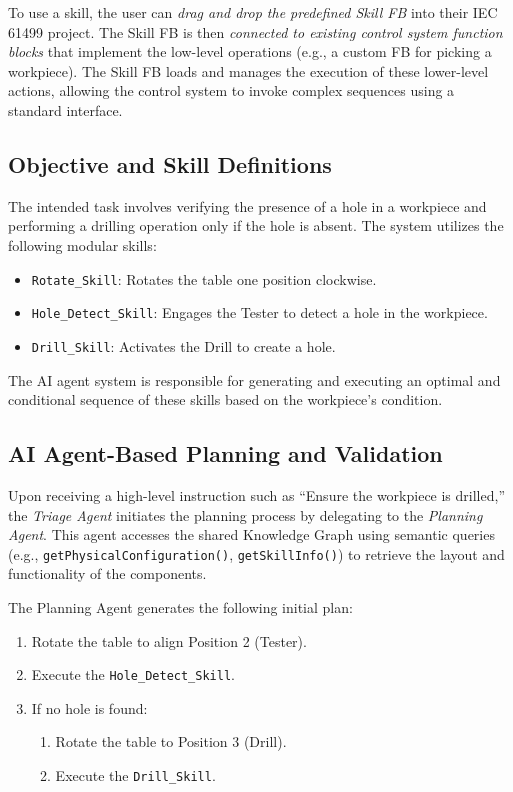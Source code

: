 \documentclass[conference]{IEEEtran}
\begin{document}
To use a skill, the user can \textit{drag and drop the predefined Skill FB} into their IEC 61499 project. The Skill FB is then \textit{connected to existing control system function blocks} that implement the low-level operations (e.g., a custom FB for picking a workpiece). The Skill FB loads and manages the execution of these lower-level actions, allowing the control system to invoke complex sequences using a standard interface.


\subsection{Objective and Skill Definitions}
The intended task involves verifying the presence of a hole in a workpiece and performing a drilling operation only if the hole is absent. The system utilizes the following modular skills:
\begin{itemize}
    \item \texttt{Rotate\_Skill}: Rotates the table one position clockwise.
    \item \texttt{Hole\_Detect\_Skill}: Engages the Tester to detect a hole in the workpiece.
    \item \texttt{Drill\_Skill}: Activates the Drill to create a hole.
\end{itemize}

The AI agent system is responsible for generating and executing an optimal and conditional sequence of these skills based on the workpiece's condition.

\subsection{AI Agent-Based Planning and Validation}
Upon receiving a high-level instruction such as ``Ensure the workpiece is drilled,'' the \textit{Triage Agent} initiates the planning process by delegating to the \textit{Planning Agent}. This agent accesses the shared Knowledge Graph using semantic queries (e.g., \texttt{getPhysicalConfiguration()}, \texttt{getSkillInfo()}) to retrieve the layout and functionality of the components.

The Planning Agent generates the following initial plan:
\begin{enumerate}
    \item Rotate the table to align Position 2 (Tester).
    \item Execute the \texttt{Hole\_Detect\_Skill}.
    \item If no hole is found:
    \begin{enumerate}
        \item Rotate the table to Position 3 (Drill).
        \item Execute the \texttt{Drill\_Skill}.
    \end{enumerate}
\end{enumerate}
\end{document}
